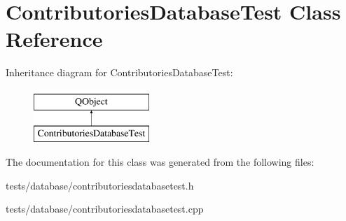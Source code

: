 \hypertarget{classContributoriesDatabaseTest}{\section{Contributories\+Database\+Test Class Reference}
\label{classContributoriesDatabaseTest}
}
Inheritance diagram for Contributories\+Database\+Test\+:\begin{figure}[H]
\begin{center}
\leavevmode
\includegraphics[height=2.000000cm]{d8/df7/classContributoriesDatabaseTest}
\end{center}
\end{figure}


The documentation for this class was generated from the following files\+:\begin{DoxyCompactItemize}
\item 
tests/database/contributoriesdatabasetest.\+h\item 
tests/database/contributoriesdatabasetest.\+cpp\end{DoxyCompactItemize}
